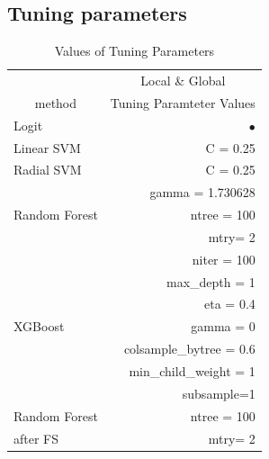 \documentclass[11pt,a4paper,oneside]{article}
\begin{document}
\newpage
\subsection{Tuning parameters}
\begin{table}[t!]
 \renewcommand\thetable{A.2}
	\centering
	\caption{Values of Tuning Parameters}
	\begin{threeparttable}
	\def\arraystretch{1}
	\begin{tabular}{*2c} 
		\toprule 
		{} & \multicolumn{1}{c}{Local \& Global}\\
		\multicolumn{1}{c}{method} & \multicolumn{1}{c}{Tuning Paramteter Values}\\
		\midrule 
		\multicolumn{1}{l}{Logit} & \multicolumn{1}{r}{$\bullet$} \\
		\multicolumn{1}{l}{Linear SVM} & \multicolumn{1}{r}{C = 0.25}\\
		\multicolumn{1}{l}{Radial SVM} & \multicolumn{1}{r}{C = 0.25}\\
		\multicolumn{1}{l}{} & \multicolumn{1}{r}{gamma = 1.730628}\\
		
		\multicolumn{1}{l}{Random Forest} &  \multicolumn{1}{r}{ntree = 100}\\
		\multicolumn{1}{l}{} &  \multicolumn{1}{r}{mtry= 2}\\
		\multicolumn{1}{l}{\multirow{7}{*}{XGBoost}} & \multicolumn{1}{r}{niter = 100}\\
	    \multicolumn{1}{l}{\multirow{7}{*}{}} &	\multicolumn{1}{r}{max\_depth = 1}\\
	    \multicolumn{1}{l}{\multirow{7}{*}{}} & \multicolumn{1}{r}{eta = 0.4}\\
	    \multicolumn{1}{l}{\multirow{7}{*}{}} & \multicolumn{1}{r}{gamma = 0}\\
	    \multicolumn{1}{l}{\multirow{7}{*}{}} & \multicolumn{1}{r}{colsample\_bytree = 0.6}\\
	    \multicolumn{1}{l}{\multirow{7}{*}{}} & \multicolumn{1}{r}{min\_child\_weight = 1}\\
	    \multicolumn{1}{l}{\multirow{7}{*}{}} & \multicolumn{1}{r}{subsample=1}\\
	    
		\multicolumn{1}{l}{Random Forest} &  \multicolumn{1}{r}{ntree = 100}\\
		\multicolumn{1}{l}{after FS} &  \multicolumn{1}{r}{mtry= 2}\\
		

\end{tabular}
\end{threeparttable}
\end{table}
\end{document}
